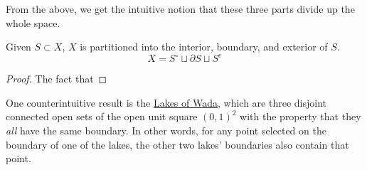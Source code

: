   From the above, we get the intuitive notion that these three parts divide up the whole space. 

  \begin{theorem}
    Given $S \subset X$, $X$ is partitioned into the interior, boundary, and exterior of $S$. 
    \begin{equation}
      X = S^\circ \sqcup \partial S \sqcup S^e
    \end{equation}
  \end{theorem}
  \begin{proof}
    The fact that 
  \end{proof}

  One counterintuitive result is the \href{https://en.wikipedia.org/wiki/Lakes_of_Wada}{Lakes of Wada}, which are three disjoint connected open sets of the open unit square $(0, 1)^2$ with the property that they \textit{all} have the same boundary. In other words, for any point selected on the boundary of one of the lakes, the other two lakes' boundaries also contain that point. 

